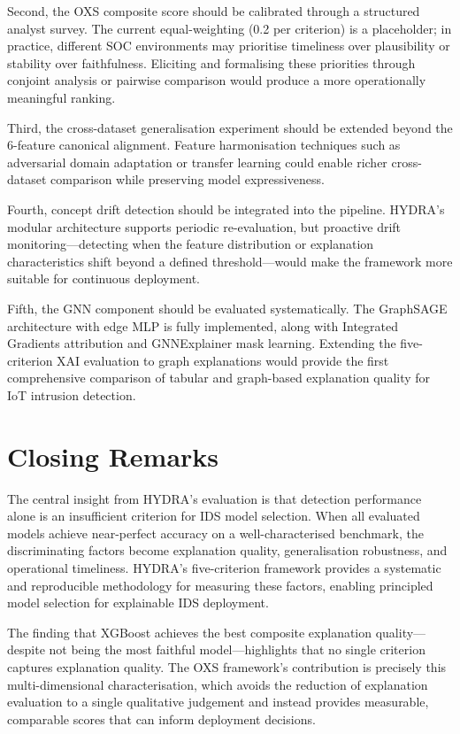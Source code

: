 \documentclass[12pt,a4paper]{report}
\begin{document}
Second, the OXS composite score should be calibrated through a structured analyst survey. The current equal-weighting (0.2 per criterion) is a placeholder; in practice, different SOC environments may prioritise timeliness over plausibility or stability over faithfulness. Eliciting and formalising these priorities through conjoint analysis or pairwise comparison would produce a more operationally meaningful ranking.

Third, the cross-dataset generalisation experiment should be extended beyond the 6-feature canonical alignment. Feature harmonisation techniques such as adversarial domain adaptation or transfer learning could enable richer cross-dataset comparison while preserving model expressiveness.

Fourth, concept drift detection should be integrated into the pipeline. HYDRA's modular architecture supports periodic re-evaluation, but proactive drift monitoring---detecting when the feature distribution or explanation characteristics shift beyond a defined threshold---would make the framework more suitable for continuous deployment.

Fifth, the GNN component should be evaluated systematically. The GraphSAGE architecture with edge MLP is fully implemented, along with Integrated Gradients attribution and GNNExplainer mask learning. Extending the five-criterion XAI evaluation to graph explanations would provide the first comprehensive comparison of tabular and graph-based explanation quality for IoT intrusion detection.

\section{Closing Remarks}
\label{sec:closing}

The central insight from HYDRA's evaluation is that detection performance alone is an insufficient criterion for IDS model selection. When all evaluated models achieve near-perfect accuracy on a well-characterised benchmark, the discriminating factors become explanation quality, generalisation robustness, and operational timeliness. HYDRA's five-criterion framework provides a systematic and reproducible methodology for measuring these factors, enabling principled model selection for explainable IDS deployment.

The finding that XGBoost achieves the best composite explanation quality---despite not being the most faithful model---highlights that no single criterion captures explanation quality. The OXS framework's contribution is precisely this multi-dimensional characterisation, which avoids the reduction of explanation evaluation to a single qualitative judgement and instead provides measurable, comparable scores that can inform deployment decisions.
\end{document}
